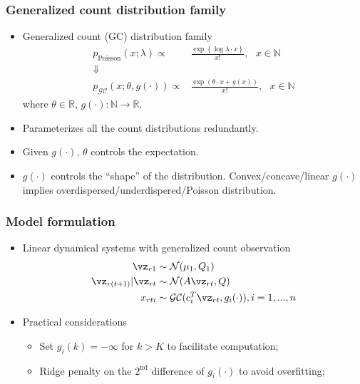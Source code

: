 \documentclass[16pt,presentation]{beamer}
\begin{document}
\begin{frame}
\frametitle{Generalized count distribution family}
\begin{itemize}
\item Generalized count (GC) distribution family
\[\begin{split}
p_{\text{Poisson}}(x; \lambda) \propto& \frac{\exp\left\{\log{\lambda} \cdot x\right\}}{x!},~~~x \in \mathbb{N}\\
\Downarrow&\\
p_{\mathcal{GC}}(x; \theta, g(\cdot)) \propto& \frac{\exp(\theta \cdot x + g(x) )}{x!}, ~~~x \in \mathbb{N}
\end{split}\]
where $\theta \in \mathbb{R}$, $g(\cdot): \mathbb{N} \rightarrow \mathbb{R}$.
\item Parameterizes \alert{all} the count distributions \alert{redundantly}.
\item Given $g(\cdot)$, $\theta$ controls the expectation.
\item $g(\cdot)$ controls the ``shape'' of the distribution. Convex/concave/linear $g(\cdot)$ implies overdispersed/underdispered/Poisson distribution.
\end{itemize}
\end{frame}


\begin{frame}
\frametitle{Model formulation}
 \begin{itemize}
 \item Linear dynamical systems with generalized count observation 
 \[\begin{split}
 \vz_{r1} &\sim \N(\mu_1, Q_1)\\
 \vz_{r(t+1)} | \vz_{rt} &\sim \N(A \vz_{rt}, Q)\\
 x_{rti} & \sim \mathcal{GC}(c_i^T \vz_{rt}, g_i(\cdot)), i = 1,...,n
 \end{split}\]
 \item Practical considerations
 \begin{itemize}
 \item Set $g_i(k) = -\infty$ for $k > K$ to facilitate computation;
 \item Ridge penalty on the $2^{\text{nd}}$ difference of $g_i(\cdot)$ to avoid overfitting;
 \end{itemize}
 \end{itemize}
\end{frame}
\end{document}
